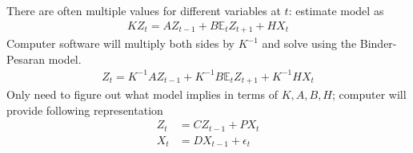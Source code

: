 \documentclass{beamer}
\begin{document}
\begin{frame}
  There are often multiple values for different variables at $t$: estimate model as
  \begin{align}
    KZ_t=AZ_{t-1} + B\mathbb{E}_t Z_{t+1} + HX_t
  \end{align}
  Computer software will multiply both sides by $K^{-1}$  and solve using the Binder-Pesaran model. 
\begin{align}
  Z_t= K^{-1}AZ_{t-1} + K^{-1}B\mathbb{E}_t Z_{t+1} + K^{-1}HX_t
\end{align}
 Only need to figure out what model implies in terms of $K,A,B,H$; computer will provide following representation
  \begin{align}
    Z_t &= CZ_{t-1} + PX_t\\
    X_t &=DX_{t-1} + \epsilon_t
  \end{align}
\end{frame}


\end{document}

